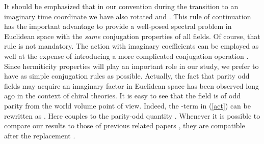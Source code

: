 \documentclass[a4paper,12pt]{article}
\begin{document}
It should be emphasized that in our convention during the 
transition to an imaginary time coordinate we have also 
rotated \coordHE{} and \coordHE{}. 
This rule of continuation has 
the important advantage to provide a well-posed spectral 
problem in Euclidean space with the {\em same} conjugation 
properties of all fields. Of course, that rule is not 
mandatory. The action with imaginary
coefficients can be employed as well
 at the expense of introducing a more complicated
conjugation operation \cite{Osborn91}. Since hermiticity
properties will play an important role in our study, we prefer
to have as simple conjugation rules as possible. Actually,
the fact that parity odd fields may acquire an imaginary factor 
in Euclidean space has been observed long ago \cite{AB} in 
the context of chiral theories. It is easy to see that the 
field \coordHE{} is of odd parity from the world volume point 
of view. Indeed, the \coordHE{}-term in (\ref{act}) can be rewritten as 
\coordHE{}.  Here \coordHE{} couples to the parity-odd quantity 
\coordHE{}. 
Whenever it is possible to compare our results to those of previous related
papers \cite{ACNY87,Callan88,Osborn91},
they are compatible after the replacement \coordHE{}.
\end{document}
